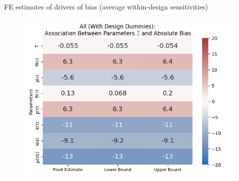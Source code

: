 \documentclass[aspectratio=169]{beamer}
\begin{document}
\begin{frame}{FE estimates of drivers of bias (average within-design sensitivities)}
	\begin{figure}[H]
		\centering
		\includegraphics[scale=0.5]{VEMethod_Drivers1b_FEest_Li_Heatmap.png}
	\end{figure}
\end{frame}
\end{document}
